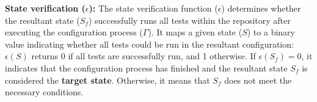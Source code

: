 
\textbf{State verification ($\epsilon$):}
The state verification function ($\epsilon$) determines whether the resultant state ($S_f$) successfully runs all tests within the repository after executing the configuration process ($\Gamma$). It maps a given state ($S$) to a binary value indicating whether all tests could be run in the resultant configuration: $\epsilon(S)$ returns 0 if all tests are successfully run, and 1 otherwise.
If $\epsilon(S_f) = 0$, it indicates that the configuration process has finished and the resultant state $S_f$ is considered the \textbf{target state}. Otherwise, it means that $S_f$ does not meet the necessary conditions.

